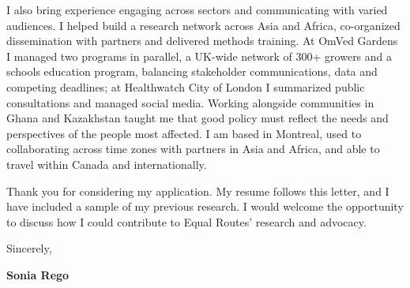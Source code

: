 \documentclass[10pt, letterpaper]{article}
\newcommand*{\letternamestyle}[1]{{\fontsize{10.5pt}{1em}\selectfont\bfseries\color{darktext}#1}}
\begin{document}
{I also bring experience engaging across sectors and communicating with varied audiences. I helped build a research network across Asia and Africa, co-organized dissemination with partners and delivered methods training. At OmVed Gardens I managed two programs in parallel, a UK-wide network of 300+ growers and a schools education program, balancing stakeholder communications, data and competing deadlines; at Healthwatch City of London I summarized public consultations and managed social media. Working alongside communities in Ghana and Kazakhstan taught me that good policy must reflect the needs and perspectives of the people most affected. I am based in Montreal, used to collaborating across time zones with partners in Asia and Africa, and able to travel within Canada and internationally.

Thank you for considering my application. My resume follows this letter, and I have included a sample of my previous research. I would welcome the opportunity to discuss how I could contribute to Equal Routes' research and advocacy.

Sincerely,

\par}

\vspace{1mm}
\letternamestyle{Sonia Rego}
\end{document}
